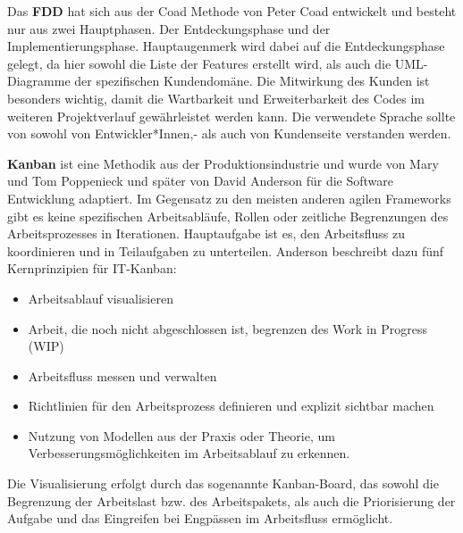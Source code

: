 Das \textbf{FDD} hat sich aus der Coad Methode von Peter Coad entwickelt und besteht nur aus zwei Hauptphasen. 
Der Entdeckungsphase und der Implementierungsphase. Hauptaugenmerk wird dabei auf die Entdeckungsphase gelegt, da hier sowohl die Liste der Features erstellt wird, als auch die UML-Diagramme der spezifischen Kundendomäne. 
Die Mitwirkung des Kunden ist besonders wichtig, damit die Wartbarkeit und Erweiterbarkeit des Codes im weiteren Projektverlauf gewährleistet werden kann. 
Die verwendete Sprache sollte von sowohl von Entwickler*Innen,- als auch von Kundenseite verstanden werden. \cite{Chowdhury2011-hg}
\newline

\textbf{Kanban} ist eine Methodik aus der Produktionsindustrie und wurde von Mary und Tom Poppenieck und später von David Anderson für die Software Entwicklung adaptiert.
Im Gegensatz zu den meisten anderen agilen Frameworks gibt es keine spezifischen Arbeitsabläufe, Rollen oder zeitliche Begrenzungen des Arbeitsprozesses in Iterationen. 
Hauptaufgabe ist es, den Arbeitsfluss zu koordinieren und in Teilaufgaben zu unterteilen. Anderson beschreibt dazu fünf Kernprinzipien für IT-Kanban:
\begin{itemize}
    \item Arbeitsablauf visualisieren
    \item Arbeit, die noch nicht abgeschlossen ist, begrenzen des Work in Progress (WIP) 
    \item Arbeitsfluss messen und verwalten
    \item Richtlinien für den Arbeitsprozess definieren und explizit sichtbar machen
    \item Nutzung von Modellen aus der Praxis oder Theorie, um Verbesserungsmöglichkeiten im Arbeitsablauf zu erkennen.
\end{itemize}
Die Visualisierung erfolgt durch das sogenannte Kanban-Board, das sowohl die Begrenzung der Arbeitslast bzw. des Arbeitspakets, 
als auch die Priorisierung der Aufgabe und das Eingreifen bei Engpässen im Arbeitsfluss ermöglicht. \cite{Ahmad2018-jv,Granulo2019-wm}
\newline


